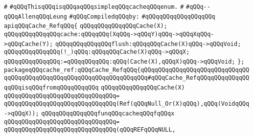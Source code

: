 \label{src/lib/compiler/back/low/library/cache.pkg}
\verb|#|\newline
\verb|#qQQqThisqQQqisqQQqaqQQqsimpleqQQqcacheqQQqenum.|\newline
\verb|#|\newline
\verb|#qQQq--qQQqAllenqQQqLeung|\newline
\newline
\verb|#qQQqCompiledqQQqby:|\newline
\verb|#qQQqqQQqqQQqqQQqqQQq|\newline
\newline
\newline
\verb|apiqQQqCache_RefqQQq{|\newline
\newline
\verb|qQQqqQQqqQQqqQQqCache(X);|\newline
\newline
\verb|qQQqqQQqqQQqqQQqcache:qQQqqQQq(XqQQq->qQQqY)qQQq->qQQqXqQQq->qQQqCache(Y);|\newline
\verb|qQQqqQQqqQQqqQQqflush:qQQqqQQqCache(X)qQQq->qQQqVoid;|\newline
\verb|qQQqqQQqqQQqqQQq(!_)qQQq:qQQqqQQqCache(X)qQQq->qQQqX;|\newline
\verb|qQQqqQQqqQQqqQQq:=qQQqqQQqqQQq:qQQq(Cache(X),qQQqX)qQQq->qQQqVoid;|\newline
\newline
\verb|};|\newline
\newline
\verb|packageqQQqcache_ref:qQQqCache_RefqQQq{qQQqqQQqqQQqqQQqqQQqqQQqqQQqqQQqqQQqqQQqqQQqqQQqqQQqqQQqqQQqqQQqqQQqqQQq#qQQqCache_RefqQQqqQQqqQQqqQQqqQQqisqQQqfromqQQqqQQqqQQq|\newline
\newline
\verb|qQQqqQQqqQQqqQQqCache(X)|\newline
\verb|qQQqqQQqqQQqqQQqqQQqqQQqqQQqqQQq=|\newline
\verb|qQQqqQQqqQQqqQQqqQQqqQQqqQQqqQQq(Ref(qQQqNull_Or(X)qQQq),qQQq(VoidqQQq->qQQqX));|\newline
\newline
\newline
\verb|qQQqqQQqqQQqqQQqfunqQQqcacheqQQqfqQQqx|\newline
\verb|qQQqqQQqqQQqqQQqqQQqqQQqqQQqqQQq=|\newline
\verb|qQQqqQQqqQQqqQQqqQQqqQQqqQQqqQQq(qQQqREFqQQqNULL,|\newline
